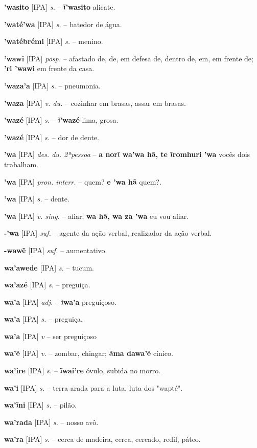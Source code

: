 \textbf{'wasito} [IPA] \textit{s.} -- \textbf{ĩ'wasito} alicate.

\textbf{'waté'wa} [IPA] \textit{s.} -- batedor de água.

\textbf{'watébrémi} [IPA] \textit{s.} -- menino.

\textbf{'wawi} [IPA] \textit{posp.} -- afastado de, de, em defesa de, dentro de, em, em frente de; \textbf{'ri 'wawi} em frente da casa.

\textbf{'waza'a} [IPA] \textit{s.} -- pneumonia.

\textbf{'waza} [IPA] \textit{v. du.} -- cozinhar em brasas, assar em brasas.

\textbf{'wazé} [IPA] \textit{s.} -- \textbf{ĩ'wazé} lima, grosa.

\textbf{'wazé} [IPA] \textit{s.} -- dor de dente.

\textbf{'wa} [IPA] \textit{des. du. 2ªpessoa} -- \textbf{a norĩ wa'wa hã, te ĩromhuri 'wa} vocês dois trabalham.

\textbf{'wa} [IPA] \textit{pron. interr.} -- quem? \textbf{e 'wa hã} quem?.

\textbf{'wa} [IPA] \textit{s.} -- dente.

\textbf{'wa} [IPA] \textit{v. sing.} -- afiar; \textbf{wa hã, wa za 'wa} eu vou afiar.

\textbf{-'wa} [IPA] \textit{suf.} -- agente da ação verbal, realizador da ação verbal.

\textbf{-wawẽ} [IPA] \textit{suf.} -- aumentativo.

\textbf{wa'awede} [IPA] \textit{s.} -- tucum.

\textbf{wa'azé} [IPA] \textit{s.} -- preguiça.

\textbf{wa'a} [IPA] \textit{adj.} -- \textbf{ĩwa'a} preguiçoso.

\textbf{wa'a} [IPA] \textit{s.} -- preguiça.

\textbf{wa'a} [IPA] \textit{v} -- {ser preguiçoso}

\textbf{wa'ẽ} [IPA] \textit{v.} -- zombar, chingar; \textbf{ãma dawa'ẽ} cínico.

\textbf{wa'ire} [IPA] \textit{s.} -- \textbf{ĩwai're} óvulo, subida no morro.

\textbf{wa'i} [IPA] \textit{s.} -- terra arada para a luta, luta dos "wapté".

\textbf{wa'ĩni} [IPA] \textit{s.} -- pilão.

\textbf{wa'rada} [IPA] \textit{s.} -- nosso avô.

\textbf{wa'ra} [IPA] \textit{s.} -- cerca de madeira, cerca, cercado, redil, páteo.


